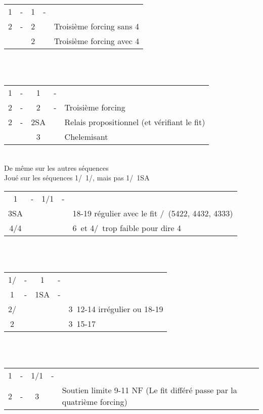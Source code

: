 \documentclass[a4paper, oneside, 11pt]{report}
\begin{document}
		\begin{tabular}{cccc|l}
		1\trefle & - & 1\pique & - &\\
		2\trefle & - & 2\carreau && Troisième forcing sans 4\coeur\\
		&& 2\coeur && Troisième forcing avec 4\coeur\\
		\end{tabular}\\\\
			
		\begin{tabular}{cccc|l}
		1\trefle & - & 1\coeur & - &\\
		2\trefle & - & 2\carreau & - & Troisième forcing\\
		2\coeur & - & 2SA && Relais propositionnel (et vérifiant le fit)\\
		&& 3\coeur &&Chelemisant\\
		\end{tabular}\\
		De même sur les autres séquences\\

		Joué sur les séquences 1\trefle/\carreau\ 1\coeur/\pique,  mais pas 1\trefle/\carreau\ 1SA\\

		\begin{tabular}{cccc|l}
		1\trefle & - & 1\coeur/1\pique & - &\\
		3SA &&&& 18-19 régulier avec le fit \coeur/\pique\ (5422, 4432, 4333)\\
		4\coeur/4\pique &&&& 6\trefle\ et 4\coeur/\pique\ trop faible pour dire 4\trefle\\
		\end{tabular}\\\\

		\begin{tabular}{cccc|l}
		1\trefle/\carreau & - & 1\coeur & - &\\
		1\pique  & - & 1SA & - &\\
		2\carreau/\trefle &&&& 3\coeur\ 12-14 irrégulier ou 18-19\\
		2\coeur &&&& 3\coeur\ 15-17\\
		\end{tabular}\\\\

		\begin{tabular}{cccc|l}
		1\carreau & - & 1\coeur/1\pique & - &\\
		2\trefle  & - & 3\carreau && Soutien limite 9-11 NF (Le fit différé passe par la quatrième forcing)\\
		\end{tabular}\\\\
\end{document}
